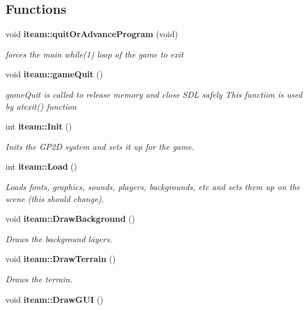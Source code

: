 \subsection*{Functions}
\begin{CompactItemize}
\item 
void {\bf iteam::quitOrAdvanceProgram} (void)\label{namespaceiteam_7bb0444901b9c265d69a6bb28173141c}

\begin{CompactList}\small\item\em forces the main while(1) loop of the game to exit \item\end{CompactList}\item 
void {\bf iteam::gameQuit} ()\label{namespaceiteam_b28f1fdb3c6c7bebd0e427d612c624dd}

\begin{CompactList}\small\item\em gameQuit is called to release memory and close SDL safely This function is used by atexit() function \item\end{CompactList}\item 
int {\bf iteam::Init} ()
\begin{CompactList}\small\item\em Inits the GP2D system and sets it up for the game. \item\end{CompactList}\item 
int {\bf iteam::Load} ()
\begin{CompactList}\small\item\em Loads fonts, graphics, sounds, players, backgrounds, etc and sets them up on the scene (this should change). \item\end{CompactList}\item 
void {\bf iteam::DrawBackground} ()\label{namespaceiteam_34827c732fba7203ecb8225d132070f9}

\begin{CompactList}\small\item\em Draws the background layers. \item\end{CompactList}\item 
void {\bf iteam::DrawTerrain} ()\label{namespaceiteam_d76338a971a09a1935cdc23ce730e46b}

\begin{CompactList}\small\item\em Draws the terrain. \item\end{CompactList}\item 
void {\bf iteam::DrawGUI} ()\label{namespaceiteam_435bcd65440f5ec4c2ef1c53b2e0e332}


\end{CompactItemize}

